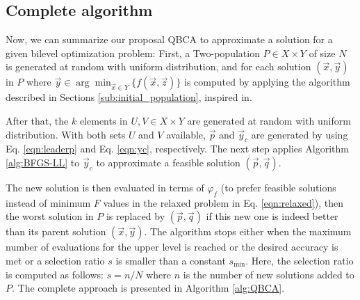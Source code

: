 \documentclass[conference]{IEEEtran}
\theoremstyle{definition}
\begin{document}


\subsection{Complete algorithm}

Now, we can summarize our proposal QBCA to approximate a solution for a given bilevel
optimization problem: First, a Two-population $P \in X \times Y$ of size $N$ is
generated at random with uniform distribution, and for each solution $(\vec{x}, \vec{y})$
in $P$ where $\vec{y} \in \arg \min_{\vec{x}\in Y} \{ f(\vec{x},\vec{z})\}$
is computed by applying the algorithm described in Sections \ref{sub:initial_population},
inspired in\cite{Mejia2018}. 

After that, the $k$ elements in $U, V \in X\times Y$ are generated at random with
uniform distribution. With both sets $U$ and $V$ available, $\vec{p}$ and $\vec{y}_c$
are generated by using Eq. \ref{eqn:leaderp} and Eq. \ref{eqn:yc}, respectively.
The next step applies Algorithm \ref{alg:BFGS-LL} to $\vec{y}_c$ to approximate
a feasible solution $(\vec{p}, \vec{q})$. 

The new solution is then evaluated in terms of $\varphi_f$ (to prefer feasible
solutions instead of minimum $F$ values in the relaxed problem in Eq. \ref{eqn:relaxed}),
then the worst solution in $P$ is replaced by $(\vec{p}, \vec{q})$ if this new
one is indeed better than its parent solution $(\vec{x}, \vec{y})$. The algorithm
stops either when the maximum number of evaluations for the upper level is reached
or the desired accuracy is met or a selection ratio $s$ is smaller than a constant
$s_{\min}$. Here, the selection ratio is computed as follows: $ s = n /N$ where
$n$ is the number of new solutions added to $P$. The complete approach is presented in 
Algorithm \ref{alg:QBCA}.
\end{document}
